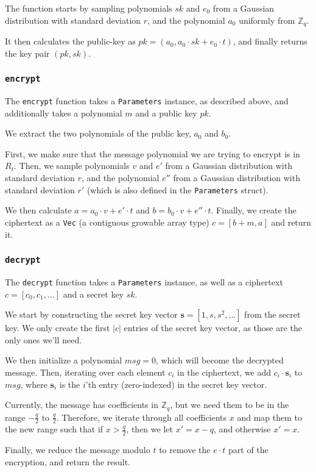 \documentclass[../main.tex]{subfiles}
\begin{document}
The function starts by sampling polynomials $sk$ and $e_0$ from a Gaussian distribution with standard deviation $r$, and the polynomial $a_0$ uniformly from $\mathbb{Z}_q$.

It then calculates the public-key as $pk = (a_0, a_0 \cdot sk + e_0 \cdot t)$, and finally returns the key pair $(pk, sk)$.

\subsubsection{\lstinline{encrypt}}

The \lstinline{encrypt} function takes a \lstinline{Parameters} instance, as described above, and additionally takes a polynomial $m$ and a public key $pk$.

We extract the two polynomials of the public key, $a_0$ and $b_0$.

First, we make sure that the message polynomial we are trying to encrypt is in $R_t$.
Then, we sample polynomials $v$ and $e'$ from a Gaussian distribution with standard deviation $r$, and the polynomial $e''$ from a Gaussian distribution with standard deviation $r'$ (which is also defined in the \lstinline{Parameters} struct).

We then calculate $a = a_0 \cdot v + e' \cdot t$ and $b = b_0 \cdot v + e'' \cdot t$.
Finally, we create the ciphertext as a \lstinline{Vec} (a contiguous growable array type) $c = [b + m, a]$ and return it.

\subsubsection{\lstinline{decrypt}}

The \lstinline{decrypt} function takes a \lstinline{Parameters} instance, as well as a ciphertext $c = [c_0, c_1, \dots]$ and a secret key $sk$.

We start by constructing the secret key vector $\mathbf{s} = [1, s, s^2, \dots]$ from the secret key.
We only create the first $|c|$ entries of the secret key vector, as those are the only ones we'll need.

We then initialize a polynomial $msg = 0$, which will become the decrypted message.
Then, iterating over each element $c_i$ in the ciphertext, we add $c_i \cdot \mathbf{s}_i$ to $msg$, where $\mathbf{s}_i$ is the $i$'th entry (zero-indexed) in the secret key vector.

Currently, the message has coefficients in $\mathbb{Z}_q$, but we need them to be in the range $-\frac{q}{2}$ to $\frac{q}{2}$.
Therefore, we iterate through all coefficients $x$ and map them to the new range such that if $x > \frac{q}{2}$, then we let $x' = x - q$, and otherwise $x' = x$.

Finally, we reduce the message modulo $t$ to remove the $e \cdot t$ part of the encryption, and return the result.
\end{document}
